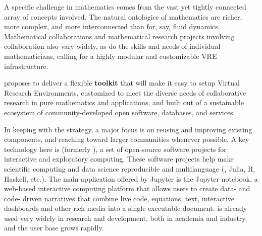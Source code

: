 
A specific challenge in mathematics comes from the vast yet
tightly connected array of concepts involved. The natural ontologies
of mathematics are richer, more complex, and more interconnected than
for, say, fluid dynamics.
%
Mathematical collaborations and mathematical research projects
involving collaboration also vary widely, as do the skills and
needs of individual mathematicians, calling for a highly modular and
customizable VRE infrastructure.


\begin{center}
  \begin{boxedminipage}{.95\textwidth}\em

    \TheProject proposes to deliver a flexible \textbf{toolkit} that
    will make it easy to setup Virtual Research Environments,
    customized to meet the diverse needs of collaborative research in
    pure mathematics and applications, and built out of a sustainable
    ecosystem of %
    community-developed open software, databases, and services.

\end{boxedminipage}
\end{center}

In keeping with the \Sage strategy, a major focus is on reusing and
improving existing components, and reaching toward larger communities
whenever possible. A key technology here is \Jupyter (formerly
\IPython), a set of open-source software projects for interactive and
exploratory computing. These software projects help make scientific
computing and data science reproducible and multilanguage (\Python,
Julia, R, Haskell, etc.). The main application offered by Jupyter is
the Jupyter notebook, a web-based interactive computing platform that
allows users to create data- and code- driven narratives that combine
live code, equations, text, interactive dashboards and other rich
media into a single executable document. \Jupyter is already used very
widely in research and development, both in academia and industry and
the user base grows rapidly.

